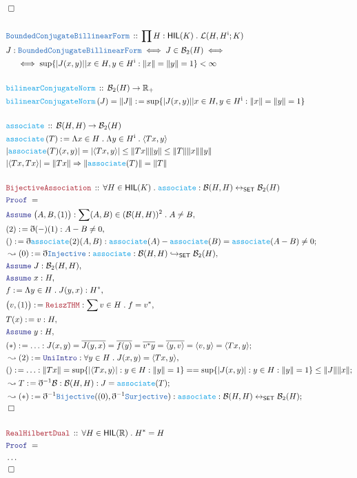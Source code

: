 \documentclass[12pt]{scrartcl}
\newcommand{\TYPE}[1]{\textcolor{NavyBlue}{\mathtt{#1}}}
\newcommand{\FUNC}[1]{\textcolor{Cerulean}{\mathtt{#1}}}
\newcommand{\LOGIC}[1]{\textcolor{Blue}{\mathtt{#1}}}
\newcommand{\THM}[1]{\textcolor{Maroon}{\mathtt{#1}}}
\renewcommand{\.}{\; . \;}
\newcommand{\de}{: \kern 0.1pc =}
\newcommand{\Act}[1]{\left( #1 \right)}
\newcommand{\Theorem}[2]{& \THM{#1} \, :: \, #2 \\ & \Proof = \\ }
\newcommand{\DeclareType}[2]{& \TYPE{#1} \, :: \, #2 \\}
\newcommand{\DefineNamedType}[4]{& #1 : \TYPE{#2} \iff #3 \iff #4 \\}
\newcommand{\DeclareFunc}[2]{& \FUNC{#1} \, :: \, #2 \\}
\newcommand{\DefineFunc}[3]{&  \FUNC{#1}\Act{#2} \de #3 \\}
\newcommand{\DefineNamedFunc}[4]{&  \FUNC{#1}\Act{#2} = #3 \de #4 \\}
\newcommand{\NewLine}{\\ & \kern 1pc}
\newcommand{\Page}[1]{\begin{align*} #1 \end{align*} \newpage   }
\newcommand{ \bd }{ \ByDef }
\newcommand{\NoProof}{ & \ldots \\ \EndProof}
\newcommand{\Reals}{\mathbb{R} }
\newcommand{\ToInj}{\hookrightarrow}
\newcommand{\ToBij}{\leftrightarrow}
\newcommand{\Say}[3]{& #1 \de #2 : #3, \\}
\newcommand{\Conclude}[3]{& #1 \de #2 : #3; \\}
\newcommand{\Derive}[3]{& \leadsto #1 \de #2 : #3, \\}
\newcommand{\DeriveConclude}[3]{& \leadsto #1 \de #2 : #3 ; \\}
\newcommand{\A}{\LOGIC{Assume} \;}
\newcommand{\Assume}[2]{& \A #1 : #2, \\}
\newcommand{\QED}{\; \square}
\newcommand{\EndProof}{& \QED \\}
\newcommand{\ByDef}{\eth}
\newcommand{\Proof}{\LOGIC{Proof} \; }
\newcommand{\HIL}{\textsf{HIL}}
\newcommand{\B}{\mathcal{B}}
\begin{document}
\Page{
\EndProof
\\
\DeclareType{BoundedConjugateBillinearForm}{\prod H : \HIL(K) \. \mathcal{L}(H,H^\mathrm{i} ; K)}
\DefineNamedType{J}{BoundedConjugateBillinearForm}
{ J \in \B_2(H) }{ 
\NewLine \iff
\sup\{ |J(x,y)| | x \in H, y \in H^\mathrm{i} : \|x\| = \|y\| = 1  \} < \infty }
\\
\DeclareFunc{bilinearConjugateNorm}{\B_2(H) \to \Reals_+}
\DefineNamedFunc{bilinearConjugateNorm}{J}{\| J \|}{ \sup\{ |J(x,y)| | x \in H, y \in H^\mathrm{i} : \|x\| = \|y\| = 1  \} }
\\
\DeclareFunc{associate}{\B(H,H) \to \B_2(H)}
\DefineFunc{associate}{T}{\Lambda x \in H \. \Lambda y \in H^{\mathrm{i}} \. \langle Tx, y \rangle}
& | \FUNC{associate}(T)(x,y) | = |\langle Tx, y \rangle| \le \| Tx \| \| y \| \le \| T \| \| x \| \| y \| \\
&  | \langle Tx , Tx \rangle | =  \| Tx \| \Rightarrow \|\FUNC{associate}(T) \| = \| T \|  \\
\\
\Theorem{BijectiveAssociation}{ \forall H \in \HIL(K) \. \FUNC{associate}  : \B(H,H) \ToBij_{\mathsf{SET}} \B_2(H)}
\Assume{\big(A,B,(1)\big)}{\sum (A,B) \in (\B(H,H))^2 \. A \neq B}
\Say{(2)}{\bd(-)(1)}{ A - B \neq 0}
\Conclude{()}{\bd \FUNC{associate}(2)(A,B)}{\FUNC{associate}(A) - \FUNC{associate}(B) = \FUNC{associate}(A - B) \neq 0}
\Derive{(0)}{\bd \TYPE{Injective}}{\FUNC{associate}  : \B(H,H) \ToInj_{\mathsf{SET}} \B_2(H)}
\Assume{J}{\B_2(H,H)}
\Assume{x}{H}
\Say{f}{\Lambda y \in H \.  J( y, x)}{H^*}
\Say{\big(v,(1)\big)}{\THM{ReiszTHM}}{\sum v \in H \. f = v^*}
\Say{T(x)}{v}{H}
\Assume{y}{H}
\Conclude{(*)}{\ldots}{J(x,y) = \overline{J(y,x)} = \overline{f(y)}  
 = \overline{v^*y} = \overline{\langle y , v \rangle} = \langle v, y \rangle = \langle  Tx, y \rangle
}
\Derive{(2)}{\LOGIC{UniIntro}}{\forall y \in H \. J(x,y) = \langle Tx, y \rangle}
\Conclude{()}{\ldots}{ \| Tx \| = \sup\{ |\langle Tx, y \rangle| : y \in H : \|y\| = 1 \} =
= \sup\{ |J(x,y)| : y \in H : \|y\| =1 \} \le \| J \| \| x \|
}
\DeriveConclude{T}{\bd^{-1} \B}{\B(H,H) : J = \FUNC{associate}(T)  }
\DeriveConclude{(*)}{\bd^{-1} \TYPE{Bijective}((0), \bd^{-1}\TYPE{Surjective})}{ \FUNC{associate}  : \B(H,H) \ToBij_{\mathsf{SET}} \B_2(H) }
\EndProof
\\
\Theorem{RealHilbertDual}{\forall H \in \HIL(\Reals) \. H^* = H}
\NoProof
}
\end{document}
